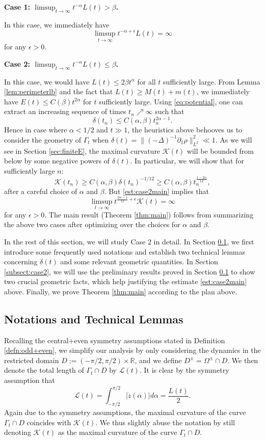 \documentclass[11pt]{article}
\numberwithin{equation}{section}
\newcommand{\eps}{\epsilon}
\newcommand{\R}{\mathbb{R}}
\newcommand{\calL}{\mathcal{L}}
\newcommand{\calK}{\mathcal{K}}
\newcommand{\dotz}{\dot{z}}
\newcommand{\p}{\partial}
\begin{document}
\medskip
\noindent\textbf{Case 1: $\limsup_{t \to \infty} t^{-\alpha}L(t) > \beta$.} 

In this case, we immediately have
$$
\limsup_{t\to\infty}t^{-\alpha+\eps}L(t) = \infty
$$
for any $\eps > 0$.

\medskip
\noindent\textbf{Case 2: $\limsup_{t \to \infty} t^{-\alpha}L(t) \le \beta$.} 

In this case, we would have $L(t) \le 2\beta t^{\alpha}$ for all $t$ sufficiently large. From Lemma \ref{lem:perimeterlb} and the fact that $L(t) \ge M(t) + m(t)$, we immediately have $E(t) \le C(\beta)t^{2\alpha}$ for $t$ sufficiently large. Using \eqref{eq:potential}, one can extract an increasing sequence of times $t_n \nearrow \infty$ such that
$$
\delta(t_n) \le C(\alpha,\beta)t_n^{2\alpha - 1}.
$$
Hence in case where $\alpha < 1/2$ and $t \gg 1$, the heuristics above behooves us to consider the geometry of $\Gamma_t$ when $\delta(t) = \|(-\Delta)^{-1}\p_1 \rho\|_{L^2}^2 \ll 1$. As we will see in Section \ref{sec:finiteE}, the maximal curvature $\calK(t)$ will be bounded from below by some negative powers of $\delta(t)$. In particular, we will show that for sufficiently large $n$:
\begin{equation}\label{est:case2main}
\calK(t_n) \ge C(\alpha,\beta)\delta(t_n)^{-1/12} \ge C(\alpha,\beta) t_n^{\frac{1-2\alpha}{12}},
\end{equation}
after a careful choice of $\alpha$ and $\beta$. But \eqref{est:case2main} implies that
$$
\limsup_{t\to\infty} t^{\frac{2\alpha-1}{12} + \eps}\calK(t) =\infty
$$
for any $\eps > 0.$ The main result (Theorem \ref{thm:main}) follows from summarizing the above two cases after optimizing over the choices for $\alpha$ and $\beta$.

In the rest of this section, we will study Case 2 in detail. In Section \ref{subsect:prelim}, we first introduce some frequently used notations and establish two technical lemmas concerning $\delta(t)$ and some relevant geometric quantities. In Section \ref{subsect:case2}, we will use the preliminary results proved in Section \ref{subsect:prelim} to show two crucial geometric facts, which help justifying the estimate \eqref{est:case2main} above. Finally, we prove Theorem \ref{thm:main} according to the plan above.

\subsection{Notations and Technical Lemmas}\label{subsect:prelim}
Recalling the central+even symmetry assumptions stated in Definition \ref{defn:odd+even}, we simplify our analysis by only considering the dynamics in the restricted domain $D := (-\pi/2, \pi/2) \times \R$, and we define $D^\pm = \Omega^\pm \cap D$. We then denote the total length of $\Gamma_t \cap D$ by $\calL(t)$. It is clear by the symmetry assumption that
$$
\calL(t) = \int_{-\pi/2}^{\pi/2} |\dotz(\alpha)| d\alpha = \frac{L(t)}{2}.
$$
Again due to the symmetry assumptions, the maximal curvature of the curve $\Gamma_t \cap D$ coincides with $\calK(t)$. We thus slightly abuse the notation by still denoting $\calK(t)$ as the maximal curvature of the curve $\Gamma_t \cap D$. 
\end{document}

